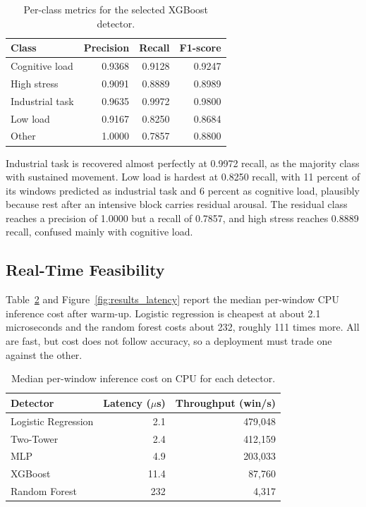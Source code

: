 \documentclass[a4paper,twoside]{article}
\begin{document}
\begin{table}[!ht]
    \caption{Per-class metrics for the selected \acs{XGBoost} detector.}\label{tab:perclass}
    \centering
    \begin{tabular}{lrrr}
        \toprule
        Class           & Precision & Recall & F1-score \\
        \midrule
        Cognitive load  & 0.9368    & 0.9128 & 0.9247   \\
        High stress     & 0.9091    & 0.8889 & 0.8989   \\
        Industrial task & 0.9635    & 0.9972 & 0.9800   \\
        Low load        & 0.9167    & 0.8250 & 0.8684   \\
        Other           & 1.0000    & 0.7857 & 0.8800   \\
        \bottomrule
    \end{tabular}
\end{table}

Industrial task is recovered almost perfectly at 0.9972 recall, as the majority class with sustained movement. Low load is hardest at 0.8250 recall, with 11 percent of its windows predicted as industrial task and 6 percent as cognitive load, plausibly because rest after an intensive block carries residual arousal. The residual class reaches a precision of 1.0000 but a recall of 0.7857, and high stress reaches 0.8889 recall, confused mainly with cognitive load.

\subsection{Real-Time Feasibility}

\noindent Table~\ref{tab:latency} and Figure~\ref{fig:results_latency} report the median per-window CPU inference cost after warm-up. Logistic regression is cheapest at about 2.1 microseconds and the random forest costs about 232, roughly 111 times more. All are fast, but cost does not follow accuracy, so a deployment must trade one against the other.

\begin{table}[!ht]
    \caption{Median per-window inference cost on CPU for each detector.}\label{tab:latency}
    \centering
    \setlength{\tabcolsep}{3.5pt}
    \footnotesize
    \begin{tabular}{@{}lrr@{}}
        \toprule
        Detector            & Latency ($\mu$s) & Throughput (win/s) \\
        \midrule
        Logistic Regression & 2.1              & 479,048            \\
        Two-Tower           & 2.4              & 412,159            \\
        \acs{MLP}           & 4.9              & 203,033            \\
        \acs{XGBoost}       & 11.4             & 87,760             \\
        Random Forest       & 232              & 4,317              \\
        \bottomrule
    \end{tabular}
\end{table}
\end{document}
